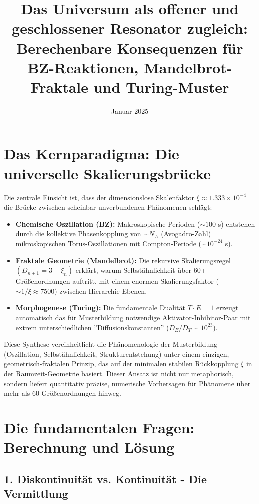 \documentclass[12pt,a4paper]{article}
\title{Das Universum als offener und geschlossener Resonator zugleich: \\
	Berechenbare Konsequenzen für BZ-Reaktionen, Mandelbrot-Fraktale und Turing-Muster}
\author{}
\date{Januar 2025}
\begin{document}
	
	\maketitle
	
	\tableofcontents
	
	\section*{Das Kernparadigma: Die universelle Skalierungsbrücke}
	
	Die zentrale Einsicht ist, dass der dimensionslose Skalenfaktor $\xi \approx 1.333 \times 10^{-4}$ die Brücke zwischen scheinbar unverbundenen Phänomenen schlägt:
	
	\begin{itemize}[label=$\bullet$]
		\item \textbf{Chemische Oszillation (BZ):} Makroskopische Perioden ($\sim 100$ s) entstehen durch die kollektive Phasenkopplung von $\sim N_A$ (Avogadro-Zahl) mikroskopischen Torus-Oszillationen mit Compton-Periode ($\sim 10^{-24}$ s).
		
		\item \textbf{Fraktale Geometrie (Mandelbrot):} Die rekursive Skalierungsregel $(D_{n+1} = 3 - \xi_n)$ erklärt, warum Selbstähnlichkeit über 60+ Größenordnungen auftritt, mit einem enormen Skalierungsfaktor ($\sim 1/\xi \approx 7500$) zwischen Hierarchie-Ebenen.
		
		\item \textbf{Morphogenese (Turing):} Die fundamentale Dualität $T \cdot E = 1$ erzeugt automatisch das für Musterbildung notwendige Aktivator-Inhibitor-Paar mit extrem unterschiedlichen ''Diffusionskonstanten'' ($D_E/D_T \sim 10^{23}$).
	\end{itemize}
	
	Diese Synthese vereinheitlicht die Phänomenologie der Musterbildung (Oszillation, Selbstähnlichkeit, Strukturentstehung) unter einem einzigen, geometrisch-fraktalen Prinzip, das auf der minimalen stabilen Rückkopplung $\xi$ in der Raumzeit-Geometrie basiert. Dieser Ansatz ist nicht nur metaphorisch, sondern liefert quantitativ präzise, numerische Vorhersagen für Phänomene über mehr als 60 Größenordnungen hinweg.
	
	\section*{Die fundamentalen Fragen: Berechnung und Lösung}
	
	\subsection*{1. Diskontinuität vs. Kontinuität - Die Vermittlung}
	
\end{document}
